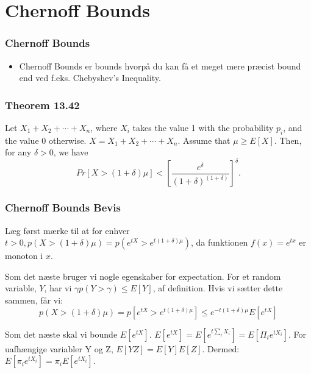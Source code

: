 \documentclass{beamer}
\begin{document}
\section{Chernoff Bounds}
\label{sec:label}

\begin{frame}
  \frametitle{Chernoff Bounds}
  
  \begin{itemize}
  \item Chernoff Bounds er bounds hvorpå du kan få et meget mere præcist bound end ved f.eks. Chebyshev's Inequality.
  \end{itemize}
\end{frame}

\begin{frame}[allowframebreaks]
  \frametitle{Theorem 13.42}
  Let $X_{1}+ X_2 + \cdots + X_{n}$, where $X_{i}$ takes the value 1 with the probability $p_{i}$, and the value 0 otherwise. $X = X_{1}+X_{2}+ \cdots + X_{n}$. Assume that $\mu \geq E[X]$. Then, for any $\delta > 0$, we have
  \begin{equation}
    Pr[X > (1+ \delta) \mu ] < \left[ \frac{e^{\delta}}{(1+\delta)^{(1 + \delta)}} \right]^{\delta}.
  \end{equation}
\end{frame}

\begin{frame}
  \frametitle{Chernoff Bounds Bevis}
  Læg først mærke til at for enhver $t > 0, p(X > (1 + \delta ) \mu) = p(e^{tX}> e^{t(1+\delta) \mu})$, da funktionen $f(x) = e^{tx}$ er monoton i $x$.

  Som det næste bruger vi nogle egenskaber for expectation. For et random variable, $Y$, har vi $\gamma p(Y > \gamma) \leq E[Y]$, af definition. Hvis vi sætter dette sammen, får vi:
  \begin{equation}
p(X > (1 + \delta ) \mu ) = p \left[ e^{tX} > e^{t(1 + \delta) \mu} \right] \leq e^{-t(1 + \delta) \mu } E \left[ e^{tX} \right]
\end{equation}

Som det næste skal vi bounde $E[e^{tX}]$. $E[e^{tX}] = E \left[ e^{t \sum_{i} X_{i}} \right] = E [ \Pi_{i} e^{tX_{i}}]$. For uafhængige variabler Y og Z, $E[YZ] = E[Y]E[Z]$. Dermed: $E[\pi_{i} e^{tX_{i}}] = \pi_{i} E[e^{tX_{i}}]$.

\end{frame}
\end{document}
